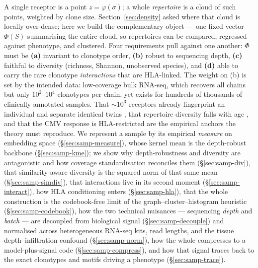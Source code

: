 \documentclass[11pt]{article}
\theoremstyle{oldplain}
\theoremstyle{oldrem}
\begin{document}
A single receptor is a point $z=\varphi(\sigma)$; a whole \emph{repertoire} is a cloud of such points, weighted
by clone size. Section~\ref{sec:density} asked where that cloud is locally over-dense; here we build the
complementary object --- one fixed vector $\Phi(S)$ summarising the entire cloud, so repertoires can be compared,
regressed against phenotype, and clustered. Four requirements pull against one another: $\Phi$ must be
\textbf{(a)} invariant to clonotype order, \textbf{(b)} robust to sequencing depth, \textbf{(c)} faithful to
diversity (richness, Shannon, unobserved species), and \textbf{(d)} able to carry the rare clonotype
\emph{interactions} that are {\scshape HLA}-linked. The weight on (b) is set by the intended data: low-coverage
bulk {\scshape RNA}-seq, which recovers all chains but only $10^2$--$10^4$ clonotypes per chain, yet exists for
hundreds of thousands of clinically annotated samples. That ${\sim}10^3$ receptors already fingerprint an
individual and separate identical twins \cite{Zvyagin2014,Dupic2021}, that repertoire diversity falls with age
\cite{Britanova2014,Alpert2019}, and that the {\scshape CMV} response is {\scshape HLA}-restricted
\cite{Emerson2017} are the empirical anchors the theory must reproduce. We represent a sample by its empirical
\emph{measure} on embedding space (\S\ref{sec:samp-measure}), whose kernel mean is the depth-robust backbone
(\S\ref{sec:samp-kme}); we show why depth-robustness and diversity are antagonistic and how coverage
standardisation reconciles them (\S\ref{sec:samp-div}), that similarity-aware diversity is the squared norm of
that same mean (\S\ref{sec:samp-simdiv}), that interactions live in its second moment
(\S\ref{sec:samp-interact}), how {\scshape HLA} conditioning enters (\S\ref{sec:samp-hla}), that the whole
construction is the codebook-free limit of the graph--cluster--histogram heuristic (\S\ref{sec:samp-codebook}),
how the two technical nuisances --- sequencing \emph{depth} and \emph{batch} --- are decoupled from biological
signal (\S\ref{sec:samp-decouple}) and normalised across heterogeneous {\scshape RNA}-seq kits, read lengths, and
the tissue depth--infiltration confound (\S\ref{sec:samp-norm}), how the whole compresses to a model-plus-signal
code (\S\ref{sec:samp-compress}), and how that signal traces back to the exact clonotypes and motifs driving a
phenotype (\S\ref{sec:samp-trace}).
\end{document}
